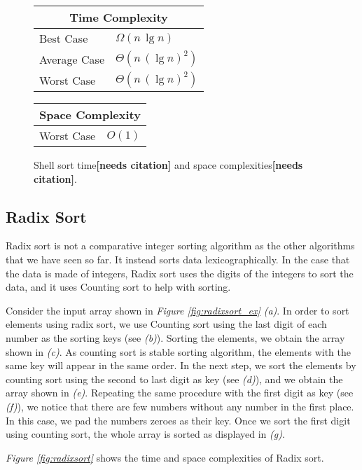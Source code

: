 \begin{figure}[!ht]
    \centering
    \begin{tabular}{l|l}
    \multicolumn{2}{c}{\textbf{Time Complexity}} \\
    \hline
    Best Case    & $\Omega(n \, \lg n)$ \\
    Average Case & $\Theta(n \, (\lg n)^2)$ \\
    Worst Case   & $\Theta(n \, (\lg n)^2)$ \\
    \end{tabular}
    \quad\quad
    \begin{tabular}{l|l}
    \multicolumn{2}{c}{\textbf{Space Complexity}} \\
    \hline
    Worst Case   & $O(1)$
    \end{tabular}
    
    \caption{Shell sort time\textbf{[needs citation]} and space complexities\textbf{[needs citation]}.}
    \label{fig:shellsort}
\end{figure}


\subsection{Radix Sort}

Radix sort is not a comparative integer sorting algorithm as the other algorithms that we have seen so far. It instead sorts data lexicographically. In the case that the data is made of integers, Radix sort uses the digits of the integers to sort the data, and it uses Counting sort to help with sorting.

Consider the input array shown in \textit{Figure \ref{fig:radixsort_ex} (a)}. In order to sort elements using radix sort, we use Counting sort using the last digit of each number as the sorting keys (see \textit{(b)}). Sorting the elements, we obtain the array shown in \textit{(c)}. As counting sort is stable sorting algorithm, the elements with the same key will appear in the same order. In the next step, we sort the elements by counting sort using the second to last digit as key (see \textit{(d)}), and we obtain the array shown in \textit{(e)}. Repeating the same procedure with the first digit as key (see \textit{(f)}), we notice that there are few numbers without any number in the first place. In this case, we pad the numbers zeroes as their key. Once we sort the first digit using counting sort, the whole array is sorted as displayed in \textit{(g)}.

\textit{Figure \ref{fig:radixsort}} shows the time and space complexities of Radix sort.


